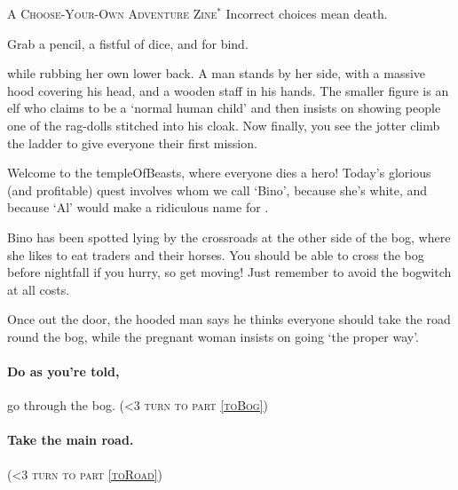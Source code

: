 \documentclass[10pt,twoside]{book}
\newcommand*\goTo[1]{({\scshape\ifnum\value{list}<3 turn to \fi part \vref{#1}})}
\begin{document}
\frontmatter
{}

\begin{center}
  
  \par
  \vspace{3\baselineskip}
  {\Large\scshape A Choose-Your-Own Adventure Zine$^{*}$}
  \vfill\null
  \ast\tiny Incorrect choices mean death.
\end{center}

\pagebreak

\small

\noindent
Grab a pencil, a fistful of dice, and  for \gls{bind}.

\clearpage
\setcounter{page}{1}
\pagestyle{plain}

while rubbing her own lower back.
A man stands by her side, with a massive hood covering his head, and a wooden staff in his hands.
The smaller figure is an elf who claims to be a `normal human child' and then insists on showing people one of the rag-dolls stitched into his cloak.
Now finally, you see the \gls{jotter} climb the ladder to give everyone their first mission.

\begin{speechtext}
  Welcome to the \gls{templeOfBeasts}, where everyone dies a hero!
  Today's glorious (and profitable) quest involves  whom we call `Bino', because she's white, and because `Al' would make a ridiculous name for .

  Bino has been spotted lying by the crossroads at the other side of the bog, where she likes to eat traders and their horses.
  You should be able to cross the bog before nightfall if you hurry, so get moving!
  Just remember to avoid the \gls{bogwitch} at all costs.
\end{speechtext}

Once out the door, the hooded man says he thinks everyone should take the road round the bog, while the pregnant woman insists on going `the proper way'.

\paragraph{Do as you're told,}
go through the bog.
\goTo{toBog}

\paragraph{Take the main road.}
\goTo{toRoad}
\end{document}
